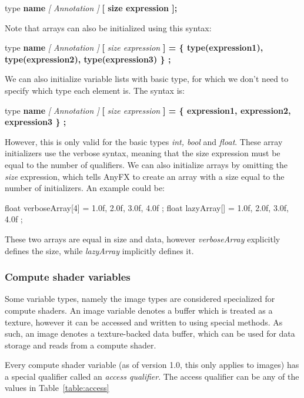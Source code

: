 \documentclass{article}
\newcommand{\SyntaxBox}[1]
{	
	\begin{center}
	\colorbox{orange!60}
	{
		\begin{minipage}{\linewidth}
		\hfill
		\begin{tabbing}
		#1
		\end{tabbing}
		\end{minipage}
	}
	\end{center}
}
\begin{document}
\SyntaxBox
{
	type \textbf{name} \textit{[ Annotation ]} \textbf{[ size expression ];}
}

Note that arrays can also be initialized using this syntax:

\SyntaxBox
{
	type \textbf{name} \textit{[ Annotation ]} \textbf{[} \textit{size expression} \textbf{] = \{ type(\textbf{expression1}), type(\textbf{expression2}), type(\textbf{expression3}) \} ;}
}

We can also initialize variable lists with basic type, for which we don't need to specify which type each element is. The syntax is:
\SyntaxBox
{
	type \textbf{name} \textit{[ Annotation ]} \textbf{[} \textit{size expression} \textbf{] = \{ \textbf{expression1}, \textbf{expression2}, \textbf{expression3} \} ;}
}

However, this is only valid for the basic types \textit{int, bool} and \textit{float}. These array initializers use the verbose syntax, meaning that the size expression must be equal to the number of qualifiers. We can also initialize arrays by omitting the \textit{size} expression, which tells AnyFX to create an array with a size equal to the number of initializers. An example could be:

\begin{CodeBox}
float verboseArray[4]	= { 1.0f, 2.0f, 3.0f, 4.0f };
float lazyArray[]			= { 1.0f, 2.0f, 3.0f, 4.0f };
\end{CodeBox}

These two arrays are equal in size and data, however \textit{verboseArray} explicitly defines the size, while \textit{lazyArray} implicitly defines it.

\subsubsection{Compute shader variables}
Some variable types, namely the image types are considered specialized for compute shaders. An image variable denotes a buffer which is treated as a texture, however it can be accessed and written to using special methods. As such, an image denotes a texture-backed data buffer, which can be used for data storage and reads from a compute shader.

Every compute shader variable (as of version 1.0, this only applies to images) has a special qualifier called an \textit{access qualifier}. The access qualifier can be any of the values in Table~\ref{table:access}

\begin{table}[hp]
\centering
\caption{Access modes}
\label{table:access}
\end{table}
\end{document}
